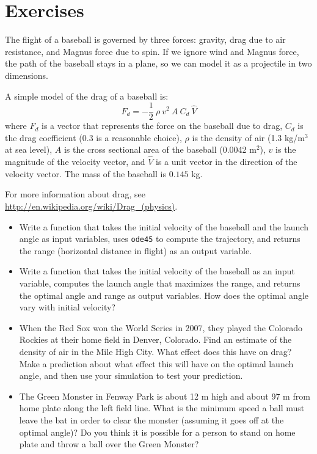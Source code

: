 \documentclass{book}
\begin{document}
\section{Exercises}

\begin{ex}
\label{baseball}

The flight of a baseball is governed by three forces: gravity,
drag due to air resistance, and Magnus force due to spin. If
we ignore wind and Magnus force, the path of the baseball stays
in a plane, so we can model it as a projectile in two
dimensions.

A simple model of the drag of a baseball is:
%
\[ F_d = -\frac{1}{2} ~ \rho ~ v^2 ~ A ~ C_d ~ \hat{V}  \]
%
where $F_d$ is a vector that represents the force on the baseball due
to drag, $C_d$ is the drag coefficient (0.3 is a reasonable choice),
$\rho$ is the density of air (1.3 kg/m$^3$ at sea level), $A$ is the
cross sectional area of the baseball (0.0042 m$^2$), $v$ is the
magnitude of the velocity vector, and $\hat{V}$ is a unit vector in
the direction of the velocity vector. The mass of the baseball is
$0.145$ kg.

For more information about drag, see
\url{http://en.wikipedia.org/wiki/Drag_(physics)}.

\begin{itemize}

\item Write a function that takes the initial velocity of the baseball
and the launch angle as input variables, uses {\tt ode45} to compute
the trajectory, and returns the range (horizontal distance in flight)
as an output variable.

\item Write a function that takes the initial velocity of the baseball
as an input variable, computes the launch angle that maximizes
the range, and returns the optimal angle and range as output variables.
How does the optimal angle vary with initial velocity?

\item When the Red Sox won the World Series in 2007, they played the
Colorado Rockies at their home field in Denver, Colorado. Find an
estimate of the density of air in the Mile High City. What effect
does this have on drag? Make a prediction about what effect this will
have on the optimal launch angle, and then use your simulation to test
your prediction.

\item The Green Monster in Fenway Park is about 12 m high and about 97
m from home plate along the left field line. What is the minimum
speed a ball must leave the bat in order to clear the monster
(assuming it goes off at the optimal angle)? Do you think it is
possible for a person to stand on home plate and throw a
ball over the Green Monster?


\end{itemize}
\end{ex}
\end{document}
